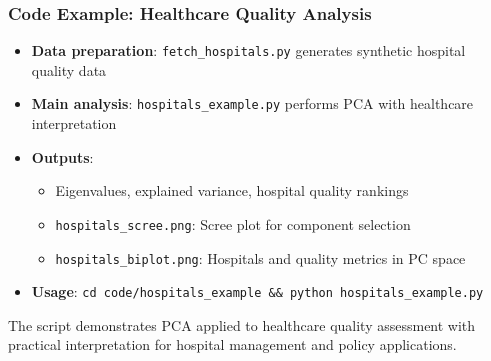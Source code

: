 \documentclass[aspectratio=169]{beamer}
\begin{document}
\begin{frame}
    \frametitle{Code Example: Healthcare Quality Analysis}
    \begin{itemize}
        \item \textbf{Data preparation}: \texttt{fetch\_hospitals.py} generates synthetic hospital quality data \pause
        \item \textbf{Main analysis}: \texttt{hospitals\_example.py} performs PCA with healthcare interpretation \pause
        \item \textbf{Outputs}:
              \begin{itemize}
                  \item Eigenvalues, explained variance, hospital quality rankings \pause
                  \item \texttt{hospitals\_scree.png}: Scree plot for component selection \pause
                  \item \texttt{hospitals\_biplot.png}: Hospitals and quality metrics in PC space \pause
              \end{itemize}
        \item \textbf{Usage}: \texttt{cd code/hospitals\_example \&\& python hospitals\_example.py} \pause
    \end{itemize}
    \vspace{6pt}
    The script demonstrates PCA applied to healthcare quality assessment with practical interpretation for hospital management and policy applications.
\end{frame}
\end{document}
